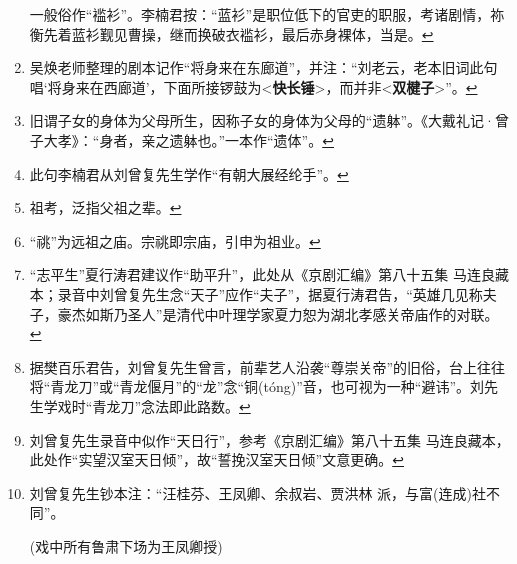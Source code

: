 \begin{enumerate}
  \leavevmode\hypertarget{fn151}{}%
  一般俗作``褴衫''。李楠君按：``蓝衫''是职位低下的官吏的职服，考诸剧情，祢衡先着蓝衫觐见曹操，继而换破衣褴衫，最后赤身裸体，当是。\protect\hyperlink{fnref151}{↩}
\item
  \leavevmode\hypertarget{fn152}{}%
  吴焕老师整理的剧本记作``将身来在东廊道''，并注：``刘老云，老本旧词此句唱`将身来在西廊道'，下面所接锣鼓为\textless{}\textbf{快长锤}\textgreater{}，而并非\textless{}\textbf{双楗子}\textgreater{}''。\protect\hyperlink{fnref152}{↩}
\item
  \leavevmode\hypertarget{fn153}{}%
  旧谓子女的身体为父母所生，因称子女的身体为父母的``遗躰''。《大戴礼记·曾子大孝》：``身者，亲之遗躰也。''一本作``遗体''。\protect\hyperlink{fnref153}{↩}
\item
  \leavevmode\hypertarget{fn154}{}%
  此句李楠君从刘曾复先生学作``有朝大展经纶手''。\protect\hyperlink{fnref154}{↩}
\item
  \leavevmode\hypertarget{fn155}{}%
  祖考，泛指父祖之辈。\protect\hyperlink{fnref155}{↩}
\item
  \leavevmode\hypertarget{fn156}{}%
  ``祧''为远祖之庙。宗祧即宗庙，引申为祖业。\protect\hyperlink{fnref156}{↩}
\item
  \leavevmode\hypertarget{fn157}{}%
  ``志平生''夏行涛君建议作``助平升''，此处从《京剧汇编》第八十五集
  马连良藏本；录音中刘曾复先生念``天子''应作``夫子''，据夏行涛君告，``英雄几见称夫子，豪杰如斯乃圣人''是清代中叶理学家夏力恕为湖北孝感关帝庙作的对联。\protect\hyperlink{fnref157}{↩}
\item
  \leavevmode\hypertarget{fn158}{}%
  据樊百乐君告，刘曾复先生曾言，前辈艺人沿袭``尊崇关帝''的旧俗，台上往往将``青龙刀''或``青龙偃月''的``龙''念``铜(tóng)''音，也可视为一种``避讳''。刘先生学戏时``青龙刀''念法即此路数。\protect\hyperlink{fnref158}{↩}
\item
  \leavevmode\hypertarget{fn159}{}%
  刘曾复先生录音中似作``天日行''，参考《京剧汇编》第八十五集
  马连良藏本，此处作``实望汉室天日倾''，故``誓挽汉室天日倾''文意更确。\protect\hyperlink{fnref159}{↩}
\item
  \leavevmode\hypertarget{fn160}{}%
  刘曾复先生钞本注：``汪桂芬、王凤卿、余叔岩、贾洪林
  派，与富(连成)社不同''。

  (戏中所有鲁肃下场为王凤卿授)


\end{enumerate}
